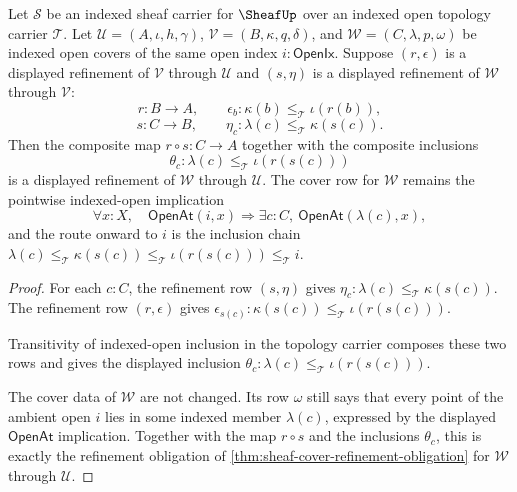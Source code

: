 \begin{theorem}
\label{thm:sheaf-refinement-composition-obligation}
Let $\mathcal{S}$ be an indexed sheaf carrier for $\SheafUp$ over an indexed open topology carrier $\mathcal{T}$. Let $\mathcal{U}=(A,\iota,h,\gamma)$, $\mathcal{V}=(B,\kappa,q,\delta)$, and $\mathcal{W}=(C,\lambda,p,\omega)$ be indexed open covers of the same open index $i:\mathsf{OpenIx}$. Suppose $(r,\epsilon)$ is a displayed refinement of $\mathcal{V}$ through $\mathcal{U}$ and $(s,\eta)$ is a displayed refinement of $\mathcal{W}$ through $\mathcal{V}$:
$$
r:B\to A,\qquad
\epsilon_b:\kappa(b)\le_{\mathcal{T}}\iota(r(b)),
$$
$$
s:C\to B,\qquad
\eta_c:\lambda(c)\le_{\mathcal{T}}\kappa(s(c)).
$$
Then the composite map $r\circ s:C\to A$ together with the composite inclusions
$$
\theta_c:\lambda(c)\le_{\mathcal{T}}\iota(r(s(c)))
$$
is a displayed refinement of $\mathcal{W}$ through $\mathcal{U}$. The cover row for $\mathcal{W}$ remains the pointwise indexed-open implication
$$
\forall x:X,\quad \mathsf{OpenAt}(i,x)\Longrightarrow\exists c:C,\ \mathsf{OpenAt}(\lambda(c),x),
$$
and the route onward to $i$ is the inclusion chain $\lambda(c)\le_{\mathcal{T}}\kappa(s(c))\le_{\mathcal{T}}\iota(r(s(c)))\le_{\mathcal{T}}i$.
\end{theorem}
\begin{proof}
For each $c:C$, the refinement row $(s,\eta)$ gives $\eta_c:\lambda(c)\le_{\mathcal{T}}\kappa(s(c))$. The refinement row $(r,\epsilon)$ gives $\epsilon_{s(c)}:\kappa(s(c))\le_{\mathcal{T}}\iota(r(s(c)))$.

Transitivity of indexed-open inclusion in the topology carrier composes these two rows and gives the displayed inclusion $\theta_c:\lambda(c)\le_{\mathcal{T}}\iota(r(s(c)))$.

The cover data of $\mathcal{W}$ are not changed. Its row $\omega$ still says that every point of the ambient open $i$ lies in some indexed member $\lambda(c)$, expressed by the displayed $\mathsf{OpenAt}$ implication. Together with the map $r\circ s$ and the inclusions $\theta_c$, this is exactly the refinement obligation of \autoref{thm:sheaf-cover-refinement-obligation} for $\mathcal{W}$ through $\mathcal{U}$.
\end{proof}

